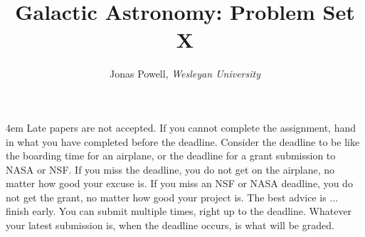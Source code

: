 \documentclass[12pt]{article}
\newenvironment{problem}[2][Problem]{\begin{trivlist}
\item[\hskip \labelsep {\bfseries #1}\hskip \labelsep {\bfseries #2.}]}{\end{trivlist}}
\begin{document}



\title{\Large \textbf{Galactic Astronomy: Problem Set X}}

\author{{\rm Jonas Powell, \textit{Wesleyan University}}}


\maketitle


\begin{addmargin}[4em]{4em}
 Late papers are not accepted. If you cannot complete the assignment, hand in what you have completed before the deadline. Consider the deadline to be like the boarding time for an airplane, or the deadline for a grant submission to NASA or NSF. If you miss the deadline, you do not get on the airplane, no matter how good your excuse is. If you miss an NSF or NASA deadline, you do not get the grant, no matter how good your project is. The best advice is ... finish early. You can submit multiple times, right up to the deadline. Whatever your latest submission is, when the deadline occurs, is what will be graded.
\bigskip \bigskip
\end{addmargin}




\begin{problem}{1}
\end{problem}
\end{document}
